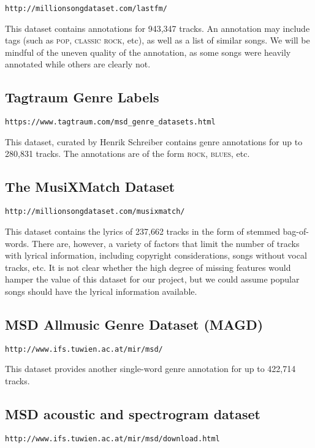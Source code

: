 \documentclass[10pt]{article}
\begin{document}
\texttt{http://millionsongdataset.com/lastfm/}

This dataset contains annotations for 943,347 tracks. An annotation may include tags (such as
\textsc{pop}, \textsc{classic rock}, etc), as well as a list of similar songs. We will be mindful of the uneven quality of the annotation, as some songs were heavily annotated while others are clearly not.

\subsection{Tagtraum Genre Labels}

\texttt{https://www.tagtraum.com/msd\_genre\_datasets.html}

This dataset, curated by Henrik Schreiber \cite{schreiber2015improving}
contains genre annotations for up to 280,831 tracks.
The annotations are of the form \textsc{rock}, \textsc{blues}, etc.

\subsection{The MusiXMatch Dataset}

\texttt{http://millionsongdataset.com/musixmatch/}

This dataset contains the lyrics of 237,662 tracks in the form of stemmed bag-of-words. There are, however, a variety of factors that limit the number of tracks with lyrical information, including copyright considerations, songs without vocal tracks, etc. It is not clear whether the high degree of missing features would hamper the value of this dataset for our project, but we could assume popular songs should have the lyrical information available.

\subsection{MSD Allmusic Genre Dataset (MAGD)}

\texttt{http://www.ifs.tuwien.ac.at/mir/msd/}

This dataset provides another single-word genre annotation for up to 422,714 tracks.

\subsection{MSD acoustic and spectrogram dataset}

\texttt{http://www.ifs.tuwien.ac.at/mir/msd/download.html}
\end{document}
